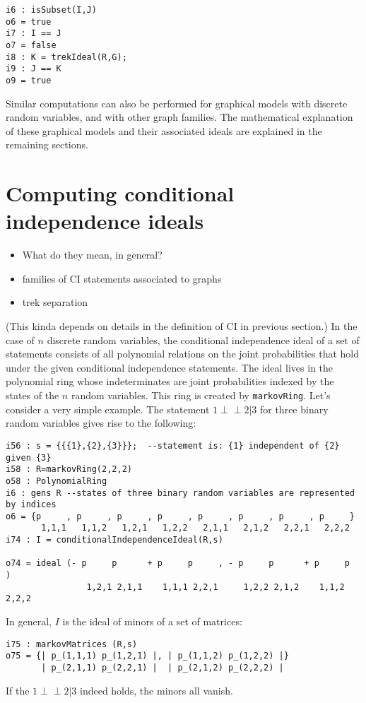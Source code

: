 \documentclass{article}
\theoremstyle{definition}
\def\ci{\perp\!\!\!\perp}
\begin{document}
\begin{verbatim}
i6 : isSubset(I,J)
o6 = true
i7 : I == J
o7 = false
i8 : K = trekIdeal(R,G);
i9 : J == K
o9 = true
\end{verbatim}

Similar computations can also be performed for graphical models
with discrete random variables,
and with other graph families.  The mathematical explanation of
these graphical models and their associated ideals
are explained in the remaining sections.


\section{Computing conditional independence ideals}

\begin{itemize}
\item What do they mean, in general? 
\item  families of CI statements associated to graphs
\item trek separation
\end{itemize}

(This kinda depends on details in the definition of CI in previous section.)
In the case of $n$ discrete random variables, the conditional independence ideal of a set of statements consists of all polynomial relations on the joint probabilities that hold under the given conditional independence statements.  The ideal lives in the polynomial ring whose indeterminates are joint probabilities indexed by the states of the $n$ random variables. This ring is created by {\tt markovRing}.
Let's consider a very simple example. The statement $1\ci 2 | 3$ for three binary random variables gives rise to the following:

\begin{verbatim}
i56 : s = {{{1},{2},{3}}};  --statement is: {1} independent of {2} given {3}
i58 : R=markovRing(2,2,2) 
o58 : PolynomialRing
i6 : gens R --states of three binary random variables are represented by indices
o6 = {p     , p     , p     , p     , p     , p     , p     , p     }
       1,1,1   1,1,2   1,2,1   1,2,2   2,1,1   2,1,2   2,2,1   2,2,2
i74 : I = conditionalIndependenceIdeal(R,s)

o74 = ideal (- p     p      + p     p     , - p     p      + p     p     )
                1,2,1 2,1,1    1,1,1 2,2,1     1,2,2 2,1,2    1,1,2 2,2,2
\end{verbatim}
In general, $I$ is the ideal of minors of a set of matrices: 
\begin{verbatim}
i75 : markovMatrices (R,s)
o75 = {| p_(1,1,1) p_(1,2,1) |, | p_(1,1,2) p_(1,2,2) |}
       | p_(2,1,1) p_(2,2,1) |  | p_(2,1,2) p_(2,2,2) |
\end{verbatim}
If the $1\ci 2 | 3$  indeed holds, the minors all vanish. 
\end{document}
